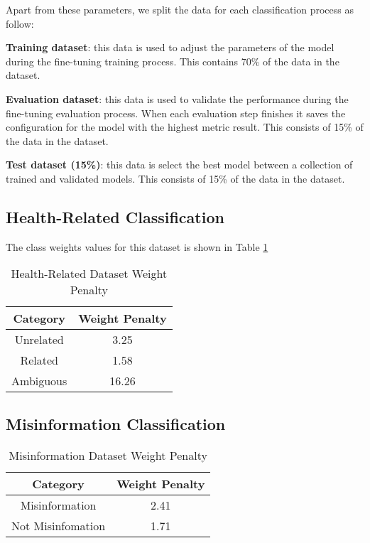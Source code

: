 Apart from these parameters, we split the data for each classification process as follow:

\begin{description}
\item{\textbf{Training dataset}}: this data is used to adjust the parameters of the model during the fine-tuning training process. This contains 70\% of the data in the dataset. 
\item{\textbf{Evaluation dataset}}: this data is used to validate the performance during the fine-tuning evaluation process. When each evaluation step finishes it saves the configuration
for the model with the highest metric result. This consists of 15\% of the data in the dataset.
\item{\textbf{Test dataset (15\%)}}: this data is select the best model between a collection of trained and validated models. This consists of 15\% of the data in the dataset.

\end{description}


\subsection{Health-Related Classification}


The class weights values for this dataset is shown in Table \ref{table:healthweight}


\begin{table}[H]
	\centering
	\caption{Health-Related Dataset Weight Penalty}
	\begin{tabular}{||c | c||} 
			\hline
			\textbf{Category} & \textbf{Weight Penalty} \\ [1.5ex] 
			\hline
			Unrelated & 3.25 \\ [1ex]
			\hline
			Related & 1.58 \\[1ex]
			\hline
			Ambiguous & 16.26 \\[1ex]
			\hline
		\end{tabular}
	\label{table:healthweight}
\end{table}


\subsection{Misinformation Classification}

\begin{table}[H]
	\centering
	\caption{Misinformation Dataset Weight Penalty}
	\begin{tabular}{||c | c||} 
		\hline
		\textbf{Category} & \textbf{Weight Penalty} \\ [1.5ex] 
		\hline
		Misinformation & 2.41  \\ [1ex]
		\hline
		Not Misinfomation & 1.71  \\[1ex]
		\hline
	\end{tabular}
	\label{table:misinformationweights}
\end{table}

